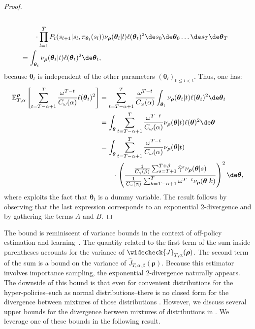\begin{proof}
\begin{align*}
   \\
   &\qquad \cdot\prod_{l=1}^{T} P_t(s_{l+1}\vert s_l, \pi_{\boldsymbol\theta_l}(s_l)) \nu_{\boldsymbol\rho}(\boldsymbol\theta_l\vert l) \ell(\boldsymbol\theta_t)^2 \de s_0 \de \boldsymbol\theta_0 \dots \de s_T \de \boldsymbol\theta_T  \\
   & =  \int_{\boldsymbol\theta_t} \nu_{\boldsymbol\rho}(\boldsymbol\theta_t\vert t) \ell(\boldsymbol\theta_t)^2 \de \boldsymbol\theta_t, 
\end{align*}
because $\boldsymbol\theta_t$ is independent of the other parameters $(\boldsymbol\theta_l)_{0\le l< t}$. 
Thus, one has:
\begin{align}
    \mathbb{E}^{\boldsymbol\rho}_{T,\alpha} \left[
        \sum_{t=T-\alpha+1}^{T} \frac{\omega^{T-t}}{C_\omega(\alpha)} \ell(\boldsymbol\theta_t)^2
    \right] \nonumber
    &= \sum_{t=T-\alpha+1}^{T} \frac{\omega^{T-t}}{C_\omega(\alpha)}  \int_{\boldsymbol\theta_t} \nu_{\boldsymbol\rho}(\boldsymbol\theta_t\vert t) \ell(\boldsymbol\theta_t)^2 \de \boldsymbol\theta_t \notag 
    \\
    &=    \int_{\boldsymbol\theta} \sum_{t=T-\alpha+1}^{T} \frac{\omega^{T-t}}{C_\omega(\alpha)} \nu_{\boldsymbol\rho}(\boldsymbol\theta\vert t) \ell(\boldsymbol\theta)^2 \de \boldsymbol\theta \label{p:0002} 
    \\
    &= \int_{\boldsymbol\theta} \sum_{t=T-\alpha+1}^{T} \frac{\omega^{T-t}}{C_\omega(\alpha)} \nu_{\boldsymbol\rho}(\boldsymbol\theta\vert t) 
    \\
    &\qquad\cdot\left( \frac{ \frac{1}{C_\gamma(\beta)} \sum_{s=T+1}^{T+\beta} \widehat{\gamma}^s\nu_{\boldsymbol\rho}(\boldsymbol\theta\vert s)}{\frac{1}{C_\omega(\alpha)} \sum_{k=T-\alpha+1}^T \omega^{T-t}\nu_{\boldsymbol\rho}(\boldsymbol\theta \vert k)}\right)^2 \de \boldsymbol\theta,\nonumber
\end{align}
where  exploits the fact that $\boldsymbol\theta_t$ is a dummy variable. 
The result follows by observing that the last expression corresponds to an exponential 2-\Renyi divergence and by gathering the terms $A$ and $B$.
\end{proof}



The bound is reminiscent of variance bounds in the context of off-policy estimation and learning~\cite{metelli2018policy, papini2019optimistic, metelli2020importance}.
The quantity related to the first term of the sum inside parentheses accounts for the variance of $\widecheck{J}_{T,\alpha}({\boldsymbol\rho})$. 
The second term of the sum is a bound on the variance of $\widehat{J}_{T,\alpha,\beta}({\boldsymbol\rho})$. 
Because this estimator involves importance sampling, the exponential $2$-\Renyi divergence naturally appears.
The downside of this bound is that even for convenient distributions for the hyper-policies--such as normal distributions--there is no closed form for the \Renyi divergence between mixtures of those distributions \cite{papini2019optimistic}.
However, we discuss several upper bounds for the \Renyi divergence between mixtures of distributions in . 
We leverage one of these bounds in the following result.


